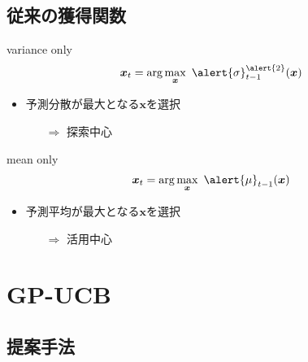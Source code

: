 \documentclass[dvipdfmx, 10.5pt]{beamer}
\begin{document}


\subsection{従来の獲得関数}
\begin{frame}{\insertsubsection}
	\begin{block}{variance only}
		\begin{align*}
			\bm x_t = \arg \max_{\bm x} ~ \alert{\sigma}_{t-1}^{\alert{2}}(\bm x)
		\end{align*}
	\end{block}
	\begin{itemize}
		\item 予測分散が最大となる$\bm x$を選択
		\begin{itemize}
			\item[$\Rightarrow$] \alert{探索}中心
		\end{itemize}
	\end{itemize}
	\begin{block}{mean only}
		\begin{align*}
			\bm x_t = \arg \max_{\bm x} ~ \alert{\mu}_{t-1}(\bm x)
		\end{align*}
	\end{block}
	\begin{itemize}
		\item 予測平均が最大となる$\bm x$を選択
		\begin{itemize}
			\item[$\Rightarrow$] \alert{活用}中心
		\end{itemize}
	\end{itemize}
\end{frame}

\section{GP-UCB}

\subsection{提案手法}
\end{document}
